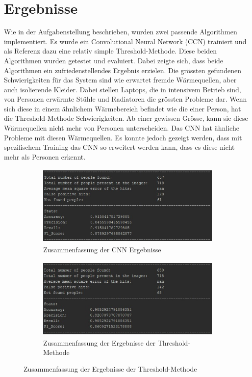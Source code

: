 \documentclass[
	a4paper
]{scrartcl}
\begin{document}
\section{Ergebnisse}
Wie in der Aufgabenstellung beschrieben, wurden zwei passende Algorithmen implementiert. Es wurde ein Convolutional Neural Network (CCN) trainiert und als Referenz dazu eine relativ simple Threshold-Methode. Diese beiden Algorithmen wurden getestet und evaluiert. Dabei zeigte sich, dass beide Algorithmen ein zufriedenstellendes Ergebnis erzielen. Die grössten gefundenen Schwierigkeiten für das System sind wie erwartet fremde Wärmequellen, aber auch isolierende Kleider. Dabei stellen Laptops, die in intensivem Betrieb sind, von Personen erwärmte Stühle und Radiatoren die grössten Probleme dar. Wenn sich diese in einem ähnlichem Wärmebereich befindet wie die einer Person, hat die Threshold-Methode Schwierigkeiten. Ab einer gewissen Grösse, kann sie diese Wärmequellen nicht mehr von Personen unterscheiden. Das CNN hat ähnliche Probleme mit diesen Wärmequellen. Es konnte jedoch gezeigt werden, dass mit spezifischem Training das CNN so erweitert werden kann, dass es diese nicht mehr als Personen erkennt. 

\begin{figure}[H]
	\begin{subfigure}{\linewidth}
		\centering
		\includegraphics[keepaspectratio, height=4cm]{cnnSummary}
		\caption{Zusammenfassung der CNN Ergebnisse}
		\label{fig:cnnSummary}		
	\end{subfigure}
	\begin{subfigure}{\linewidth}
		\centering
		\includegraphics[keepaspectratio, height=4cm]{threshSummary}
		\caption{Zusammenfassung der Ergebnisse der Threshold-Methode}
		\label{fig:threshSummary}		
	\end{subfigure}
\end{figure}
\end{document}

